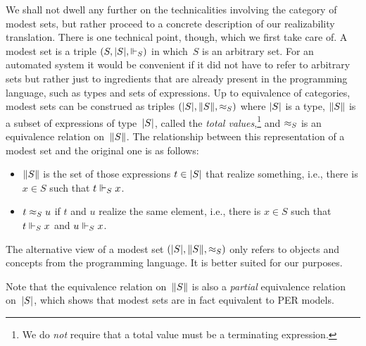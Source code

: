 We shall not dwell any further on the technicalities involving the
category of modest sets, but rather proceed to a concrete description
of our realizability translation. There is one technical point,
though, which we first take care of. A modest set is a triple $(S,
|S|, {\Vdash_S})$ in which~$S$ is an arbitrary set. For an automated
system it would be convenient if it did not have to refer to arbitrary
sets but rather just to ingredients that are already present in the
programming language, such as types and sets of expressions. Up to
equivalence of categories, modest sets can be construed as triples
$(|S|, \|S\|, {\approx_{S}})$ where $|S|$ is a type, $\|S\|$ is
a subset of expressions of type~$|S|$, called the \emph{total
  values},\footnote{We do \emph{not} require that a total value must
  be a terminating expression.} and $\approx_{S}$ is an equivalence
relation on~$\|S\|$. The relationship between this representation of
a modest set and the original one is as follows:
%
\begin{itemize}
\item $\|S\|$ is the set of those expressions $t \in |S|$ that
  realize something, i.e., there is $x \in S$ such that $t \Vdash_S x$.
\item $t \approx_{S} u$ if $t$ and $u$ realize the same element, i.e.,
  there is $x \in S$ such that $t \Vdash_S x$ and $u \Vdash_S x$.
\end{itemize}
%
The alternative view of a modest set $(|S|, \|S\|, {\approx_{S}})$
only refers to objects and concepts from the programming language. It
is better suited for our purposes.

Note that the equivalence relation on~$\|S\|$ is also a
\emph{partial} equivalence relation on~$|S|$, which shows that
modest sets are in fact equivalent to PER models.


